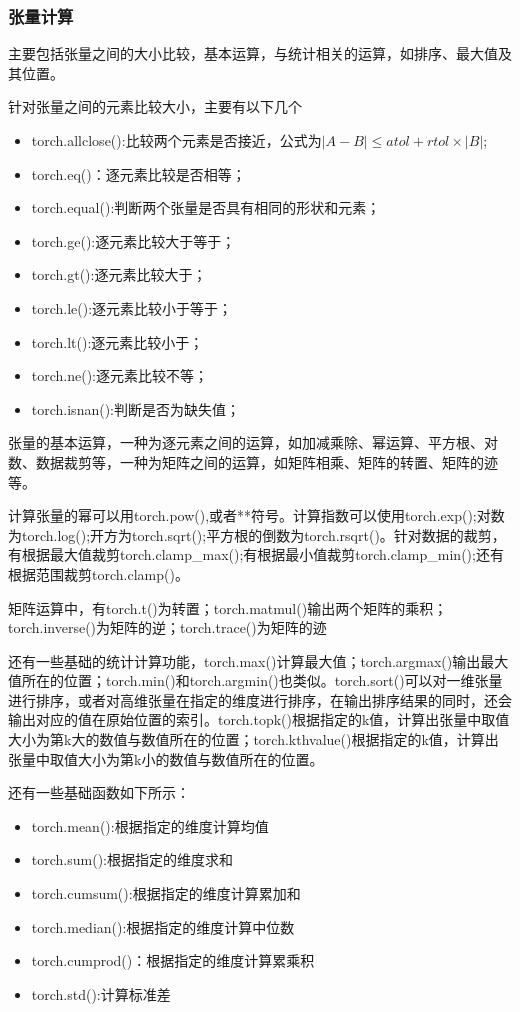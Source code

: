 \documentclass[cn,hazy,blue,14pt,screen]{elegantnote}
\begin{document}
\subsubsection{张量计算}

主要包括张量之间的大小比较，基本运算，与统计相关的运算，如排序、最大值及其位置。

针对张量之间的元素比较大小，主要有以下几个
\begin{itemize}
  \item torch.allclose():比较两个元素是否接近，公式为$|A-B|\le atol+rtol \times |B|$;
  \item torch.eq()：逐元素比较是否相等；
  \item torch.equal():判断两个张量是否具有相同的形状和元素；
  \item torch.ge():逐元素比较大于等于；
  \item torch.gt():逐元素比较大于；
  \item torch.le():逐元素比较小于等于；
  \item torch.lt():逐元素比较小于；
  \item torch.ne():逐元素比较不等；
  \item torch.isnan():判断是否为缺失值；
\end{itemize}

张量的基本运算，一种为逐元素之间的运算，如加减乘除、幂运算、平方根、对数、数据裁剪等，一种为矩阵之间的运算，如矩阵相乘、矩阵的转置、矩阵的迹等。

计算张量的幂可以用torch.pow(),或者**符号。计算指数可以使用torch.exp();对数为torch.log();开方为torch.sqrt();平方根的倒数为torch.rsqrt()。针对数据的裁剪，有根据最大值裁剪torch.clamp\_max();有根据最小值裁剪torch.clamp\_min();还有根据范围裁剪torch.clamp()。

矩阵运算中，有torch.t()为转置；torch.matmul()输出两个矩阵的乘积；torch.inverse()为矩阵的逆；torch.trace()为矩阵的迹

还有一些基础的统计计算功能，torch.max()计算最大值；torch.argmax()输出最大值所在的位置；torch.min()和torch.argmin()也类似。torch.sort()可以对一维张量进行排序，或者对高维张量在指定的维度进行排序，在输出排序结果的同时，还会输出对应的值在原始位置的索引。torch.topk()根据指定的k值，计算出张量中取值大小为第k大的数值与数值所在的位置；torch.kthvalue()根据指定的k值，计算出张量中取值大小为第k小的数值与数值所在的位置。

还有一些基础函数如下所示：
\begin{itemize}
  \item torch.mean():根据指定的维度计算均值
  \item torch.sum():根据指定的维度求和
  \item torch.cumsum():根据指定的维度计算累加和
  \item torch.median():根据指定的维度计算中位数
  \item torch.cumprod()：根据指定的维度计算累乘积
  \item torch.std():计算标准差
\end{itemize}
\end{document}

